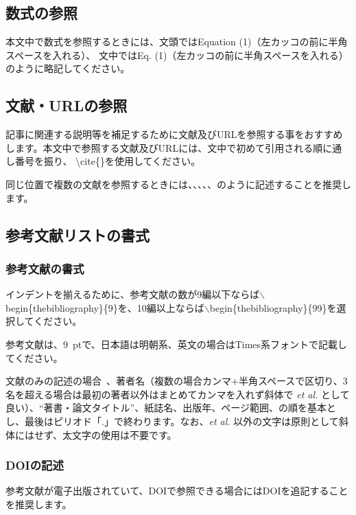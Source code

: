 \documentclass{PASJ2026}
\begin{document}
\subsection{数式の参照}
本文中で数式を参照するときには、文頭ではEquation (1)（左カッコの前に半角スペースを入れる）、
文中ではEq. (1)（左カッコの前に半角スペースを入れる）のように略記してください。
%
\subsection{文献・URLの参照}
記事に関連する説明等を補足するために文献及びURLを参照する事をおすすめします。本文中で参照する文献及びURLには、文中で初めて引用される順に通し番号を振り、 \textbackslash{cite}\{\}を使用してください。

同じ位置で複数の文献を参照するときには、\cite{Reference_JACoW_Word, Reference_JACoW_TeX}、\cite{Reference_JACoW_Word, Reference_JACoW_TeX, Reference_1}、\cite{Reference_JACoW_Word, Reference_JACoW_TeX, Reference_1, T_Tanaka}、\cite{Reference_JACoW_Word, Reference_JACoW_TeX, Reference_1, T_Tanaka, Reference_2}、\cite{Reference_JACoW_Word, Reference_JACoW_TeX, Reference_1, T_Tanaka, Reference_2, mi}のように記述することを推奨します。
%
\subsection{参考文献リストの書式}
\subsubsection{参考文献の書式}
\label{reference_format}
インデントを揃えるために、参考文献の数が9編以下ならば$\backslash$begin\{thebibliography\}\{9\}を、10編以上ならば$\backslash$begin\{thebibliography\}\{99\}を選択してください。

参考文献は、9~ptで、日本語は明朝系、英文の場合はTimes系フォントで記載してください。

文献のみの記述の場合~\cite{Reference_1}、著者名（複数の場合カンマ+半角スペースで区切り、3名を超える場合は最初の著者以外はまとめてカンマを入れず斜体で \textit{et al.} として良い）、``著書・論文タイトル''、紙誌名、出版年、ページ範囲、の順を基本とし、最後はピリオド「.」で終わります。なお、\textit{et al.} 以外の文字は原則として斜体にはせず、太文字の使用は不要です。

\subsubsection{DOIの記述}
参考文献が電子出版されていて、DOIで参照できる場合にはDOIを追記することを推奨します。
\end{document}
